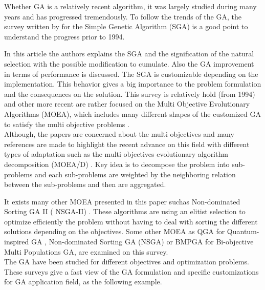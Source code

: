 Whether GA is a relatively recent algorithm, it was largely studied during many years and has progressed tremendously. To follow the trends of the GA,  the survey  written by \cite{74*srinivas1994} for the Simple Genetic Algorithm (SGA) is a good point to understand the progress prior to 1994. 

In this article \cite{74*srinivas1994} the authors explains the SGA and the signification of the natural selection with the possible modification to cumulate. 
Also the GA improvement  in terms of performance is discussed. The SGA is customizable depending on the implementation. This behavior gives a big importance to the problem formulation and the consequences on the solution.
 This survey is  relatively hold (from 1994) and other more recent are rather focused on the Multi Objective Evolutionary Algorithms (MOEA), which includes many different shapes of the customized GA to satisfy the multi objective problems \cite{75*zhou2011}. \\
Although, the papers are concerned about the multi objectives and many references are made to highlight the recent advance on this field with different types of adaptation such as the multi objectives evolutionary algorithm decomposition (MOEA/D) \cite{114*zhang2007moea}. Key idea is to decompose the problem into sub-problems and each sub-problems are weighted by the neighboring relation between the sub-problems and then are aggregated.   

It exists many other MOEA presented in this paper  suchas Non-dominated Sorting GA II ( NSGA-II) \cite{69*deb2000}. These algorithms are using an elitist selection to optimize efficiently the problem without having to  deal with sorting the different solutions depending on the objectives. Some other MOEA as QGA for Quantum-inspired GA \cite{ 69*deb2000,han2000,han2002}%
, Non-dominated Sorting GA  (NSGA) or BMPGA for Bi-objective Multi Populations GA,  are examined on this survey\cite{69*deb2000}. \\
The GA have been studied for different objectives and optimization problems. These surveys  give a fast  view of  the GA formulation and  specific customizations for  GA application field, as the following example.\\

